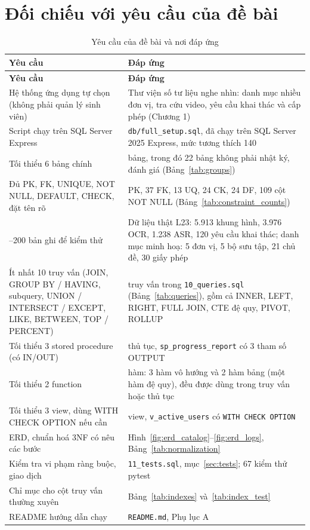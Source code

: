 \section{Đối chiếu với yêu cầu của đề bài}

\begin{longtable}{>{\raggedright\arraybackslash}p{5.4cm} >{\raggedright\arraybackslash}p{8.6cm}}
\caption{Yêu cầu của đề bài và nơi đáp ứng}\label{tab:requirements}\\
\toprule \textbf{Yêu cầu} & \textbf{Đáp ứng} \\ \midrule \endfirsthead
\toprule \textbf{Yêu cầu} & \textbf{Đáp ứng} \\ \midrule \endhead
\bottomrule \endfoot
Hệ thống ứng dụng tự chọn (không phải quản lý sinh viên) & Thư viện số tư liệu nghe nhìn: danh mục nhiều đơn vị, tra cứu video, yêu cầu khai thác và cấp phép (Chương 1) \\
Script chạy trên SQL Server Express & \texttt{db/full\_setup.sql}, đã chạy trên SQL Server 2025 Express, mức tương thích 140 \\
Tối thiểu 6 bảng chính & 30 bảng, trong đó 22 bảng không phải nhật ký, đánh giá (Bảng~\ref{tab:groups}) \\
Đủ PK, FK, UNIQUE, NOT NULL, DEFAULT, CHECK, đặt tên rõ & 30 PK, 37 FK, 13 UQ, 24 CK, 24 DF, 109 cột NOT NULL (Bảng~\ref{tab:constraint_counts}) \\
30--200 bản ghi để kiểm thử & Dữ liệu thật L23: 5.913 khung hình, 3.976 OCR, 1.238 ASR, 120 yêu cầu khai thác; danh mục minh hoạ: 5 đơn vị, 5 bộ sưu tập, 21 chủ đề, 30 giấy phép \\
Ít nhất 10 truy vấn (JOIN, GROUP BY / HAVING, subquery, UNION / INTERSECT / EXCEPT, LIKE, BETWEEN, TOP / PERCENT) & 25 truy vấn trong \texttt{10\_queries.sql} (Bảng~\ref{tab:queries}), gồm cả INNER, LEFT, RIGHT, FULL JOIN, CTE đệ quy, PIVOT, ROLLUP \\
Tối thiểu 3 stored procedure (có IN/OUT) & 10 thủ tục, \texttt{sp\_progress\_report} có 3 tham số OUTPUT \\
Tối thiểu 2 function & 5 hàm: 3 hàm vô hướng và 2 hàm bảng (một hàm đệ quy), đều được dùng trong truy vấn hoặc thủ tục \\
Tối thiểu 3 view, dùng WITH CHECK OPTION nếu cần & 11 view, \texttt{v\_active\_users} có \texttt{WITH CHECK OPTION} \\
ERD, chuẩn hoá 3NF có nêu các bước & Hình~\ref{fig:erd_catalog}--\ref{fig:erd_logs}, Bảng~\ref{tab:normalization} \\
Kiểm tra vi phạm ràng buộc, giao dịch & \texttt{11\_tests.sql}, mục~\ref{sec:tests}; 67 kiểm thử pytest \\
Chỉ mục cho cột truy vấn thường xuyên & Bảng~\ref{tab:indexes} và~\ref{tab:index_test} \\
README hướng dẫn chạy & \texttt{README.md}, Phụ lục A \\
\end{longtable}
